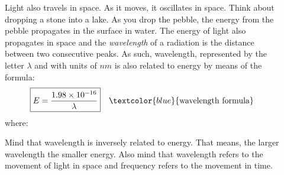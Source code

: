 \documentclass[main.tex]{subfiles}
\begin{document}
\begin{description}
\item[] Light also travels in space. As it moves, it oscillates in space. Think about dropping a stone into a lake. As you drop the pebble, the energy from the pebble propagates in the surface in water. The energy of light also propagates in space and the \emph{wavelength} of a radiation is the distance between two consecutive peaks. As such, wavelength, represented by the letter $\lambda$ and with units of $nm$ is also related to energy by means of the formula:
\begin{equation*}
\boxed{  E=\frac{1.98\times 10^{-16}}{\lambda}  } \quad \textcolor{blue}{\text{wavelength formula}}
\end{equation*}
where:
Mind that wavelength is inversely related to energy. That means, the larger wavelength the smaller energy. Also mind that wavelength refers to the movement of light in space and frequency refers to the movement in time. 






%   
%   
%   
%   
   

\end{description}
\end{document}
